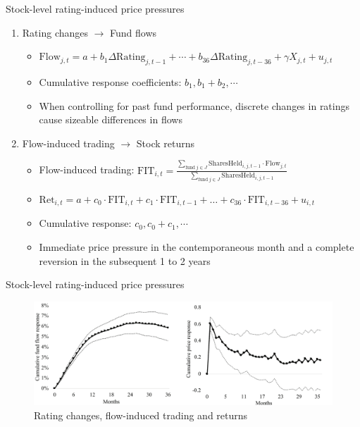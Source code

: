 \documentclass[UTF8, 16pt]{beamer}
\begin{document}
\begin{CJK*}{UTF8}{gbsn}
\begin{frame}{Stock-level rating-induced price pressures}
	\begin{enumerate}
		\item Rating changes $\rightarrow$ Fund flows
		\begin{itemize}
			\item $\mathrm{Flow} _{j, t}=a+b_{1}\Delta\mathrm{Rating}_{j, t-1}+\cdots+b_{36}\Delta\mathrm{Rating}_{j, t-36}+\gamma X_{j, t}+u_{j, t}$
			\item Cumulative response coefficients: $b_1,b_1+b_2,\cdots$
			\item When controlling for past fund performance, discrete changes in ratings cause \alert{sizeable differences in flows}
		\end{itemize}
		\item Flow-induced trading $\rightarrow$ Stock returns
		\begin{itemize}
			\item Flow-induced trading: $\mathrm{FIT}_{i, t}=\frac{\sum_{\text{fund}\ j \in J} \mathrm{SharesHeld}_{i, j, t-1} \cdot \mathrm{Flow}_{j, t}}{\sum_{\text{fund}\ j \in J} \mathrm{SharesHeld}_{i, j, t-1}}$
			\item $\mathrm{Ret}_{i, t}=a+c_{0} \cdot \mathrm{FIT}_{i, t}+c_{1} \cdot \mathrm{FIT}_{i, t-1}+\ldots+c_{36} \cdot \mathrm{FIT}_{i, t-36}+u_{i, t}$
			\item Cumulative response: $c_0,c_0+c_1,\cdots$
			\item \alert{Immediate price pressure} in the contemporaneous month and \alert{a complete reversion} in the subsequent 1 to 2 years
		\end{itemize}
	\end{enumerate}
\end{frame}

\begin{frame}{Stock-level rating-induced price pressures}
	\begin{figure}[htpb]
	  \begin{center}
	    \includegraphics[width=1.06  \linewidth]
	    {pic/price_impact.png}
	  \end{center}
	  \caption{Rating changes, flow-induced trading and returns}
	\end{figure}
\end{frame}


\end{CJK*}
\end{document}
